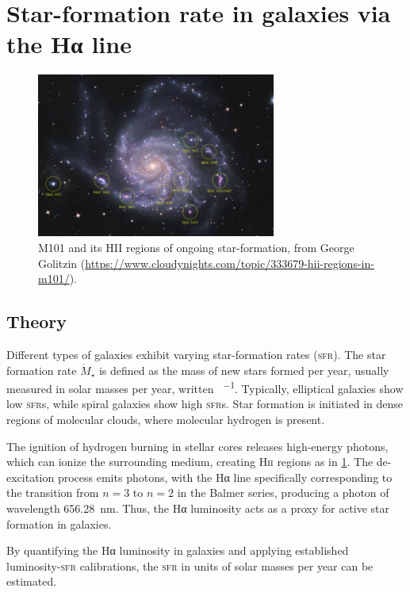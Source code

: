 \documentclass[a4paper, 11pt, fleqn]{memoir}
\begin{document}
\section{Star-formation rate in galaxies via the Hα line}
\label{sec:star-formation-rate}

\begin{figure}
    \centering
    \includegraphics[width=0.7\textwidth]{m101.jpg}
    \caption{M101 and its HII regions of ongoing star-formation, from George Golitzin (\url{https://www.cloudynights.com/topic/333679-hii-regions-in-m101/}).}
    \label{fig:hiiregions}
\end{figure}

\subsection{Theory}
Different types of galaxies exhibit varying star-formation rates (\textsc{sfr}).
The star formation rate $\dot{M}_\star$ is defined as the mass of new stars formed per year,
usually measured in solar masses per year, written \si{\Msun\per\year}.
Typically, elliptical galaxies show low \textsc{sfr}s, while spiral galaxies show high \textsc{sfr}s.
Star formation is initiated in dense regions of molecular clouds, where molecular hydrogen is present.

The ignition of hydrogen burning in stellar cores releases high-energy photons, which can ionize the surrounding medium, creating H\textsc{ii} regions as in \cref{fig:hiiregions}.
The de-excitation process emits photons, with the Hα line specifically corresponding to the transition from $n=3$ to $n=2$ in the Balmer series, producing a photon of wavelength \SI{656.28}{\nano\meter}.
Thus, the Hα luminosity acts as a proxy for active star formation in galaxies.

By quantifying the Hα luminosity in galaxies and applying established luminosity-\textsc{sfr} calibrations, the \textsc{sfr} in units of solar masses per year can be estimated.
\end{document}
